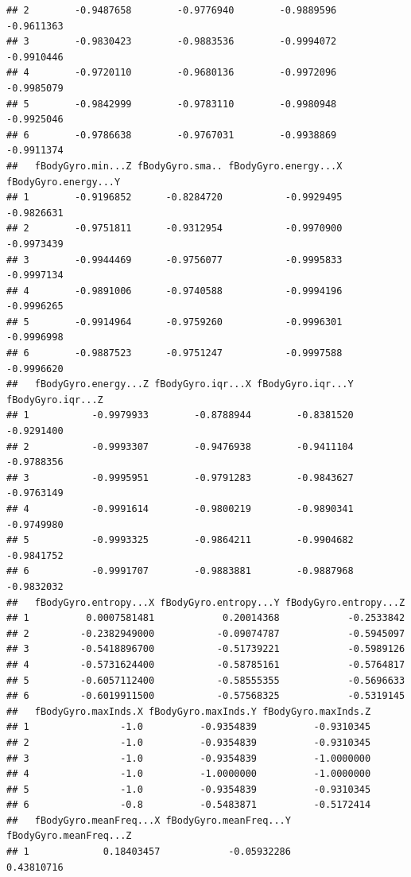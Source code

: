 \documentclass[
]{article}
\begin{document}
\begin{verbatim}
## 2        -0.9487658        -0.9776940        -0.9889596        -0.9611363
## 3        -0.9830423        -0.9883536        -0.9994072        -0.9910446
## 4        -0.9720110        -0.9680136        -0.9972096        -0.9985079
## 5        -0.9842999        -0.9783110        -0.9980948        -0.9925046
## 6        -0.9786638        -0.9767031        -0.9938869        -0.9911374
##   fBodyGyro.min...Z fBodyGyro.sma.. fBodyGyro.energy...X fBodyGyro.energy...Y
## 1        -0.9196852      -0.8284720           -0.9929495           -0.9826631
## 2        -0.9751811      -0.9312954           -0.9970900           -0.9973439
## 3        -0.9944469      -0.9756077           -0.9995833           -0.9997134
## 4        -0.9891006      -0.9740588           -0.9994196           -0.9996265
## 5        -0.9914964      -0.9759260           -0.9996301           -0.9996998
## 6        -0.9887523      -0.9751247           -0.9997588           -0.9996620
##   fBodyGyro.energy...Z fBodyGyro.iqr...X fBodyGyro.iqr...Y fBodyGyro.iqr...Z
## 1           -0.9979933        -0.8788944        -0.8381520        -0.9291400
## 2           -0.9993307        -0.9476938        -0.9411104        -0.9788356
## 3           -0.9995951        -0.9791283        -0.9843627        -0.9763149
## 4           -0.9991614        -0.9800219        -0.9890341        -0.9749980
## 5           -0.9993325        -0.9864211        -0.9904682        -0.9841752
## 6           -0.9991707        -0.9883881        -0.9887968        -0.9832032
##   fBodyGyro.entropy...X fBodyGyro.entropy...Y fBodyGyro.entropy...Z
## 1          0.0007581481            0.20014368            -0.2533842
## 2         -0.2382949000           -0.09074787            -0.5945097
## 3         -0.5418896700           -0.51739221            -0.5989126
## 4         -0.5731624400           -0.58785161            -0.5764817
## 5         -0.6057112400           -0.58555355            -0.5696633
## 6         -0.6019911500           -0.57568325            -0.5319145
##   fBodyGyro.maxInds.X fBodyGyro.maxInds.Y fBodyGyro.maxInds.Z
## 1                -1.0          -0.9354839          -0.9310345
## 2                -1.0          -0.9354839          -0.9310345
## 3                -1.0          -0.9354839          -1.0000000
## 4                -1.0          -1.0000000          -1.0000000
## 5                -1.0          -0.9354839          -0.9310345
## 6                -0.8          -0.5483871          -0.5172414
##   fBodyGyro.meanFreq...X fBodyGyro.meanFreq...Y fBodyGyro.meanFreq...Z
## 1             0.18403457            -0.05932286             0.43810716

\end{verbatim}
\end{document}
